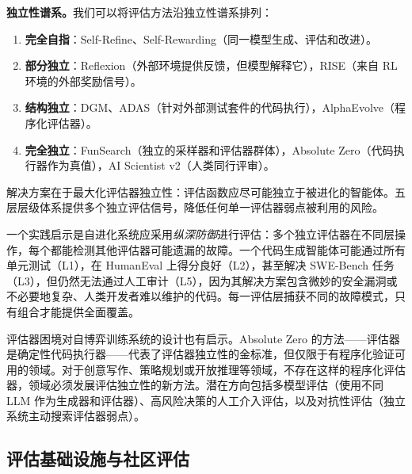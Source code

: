 \textbf{独立性谱系。}我们可以将评估方法沿独立性谱系排列：

\begin{enumerate}[nosep]
\item \textbf{完全自指}：Self-Refine、Self-Rewarding（同一模型生成、评估和改进）。
\item \textbf{部分独立}：Reflexion（外部环境提供反馈，但模型解释它），RISE（来自 RL 环境的外部奖励信号）。
\item \textbf{结构独立}：DGM、ADAS（针对外部测试套件的代码执行），AlphaEvolve（程序化评估器）。
\item \textbf{完全独立}：FunSearch（独立的采样器和评估器群体），Absolute Zero（代码执行器作为真值），AI Scientist v2（人类同行评审）。
\end{enumerate}

解决方案在于最大化评估器独立性：评估函数应尽可能独立于被进化的智能体。五层层级体系提供多个独立评估信号，降低任何单一评估器弱点被利用的风险。

一个实践启示是自进化系统应采用\emph{纵深防御}进行评估：多个独立评估器在不同层操作，每个都能检测其他评估器可能遗漏的故障。一个代码生成智能体可能通过所有单元测试（L1），在 HumanEval 上得分良好（L2），甚至解决 SWE-Bench 任务（L3），但仍然无法通过人工审计（L5），因为其解决方案包含微妙的安全漏洞或不必要地复杂、人类开发者难以维护的代码。每一评估层捕获不同的故障模式，只有组合才能提供全面覆盖。

评估器困境对自博弈训练系统的设计也有启示。Absolute Zero 的方法——评估器是确定性代码执行器——代表了评估器独立性的金标准，但仅限于有程序化验证可用的领域。对于创意写作、策略规划或开放推理等领域，不存在这样的程序化评估器，领域必须发展评估独立性的新方法。潜在方向包括多模型评估（使用不同 LLM 作为生成器和评估器）、高风险决策的人工介入评估，以及对抗性评估（独立系统主动搜索评估器弱点）。


\subsection{评估基础设施与社区评估}
\label{sec:eval-infra}

